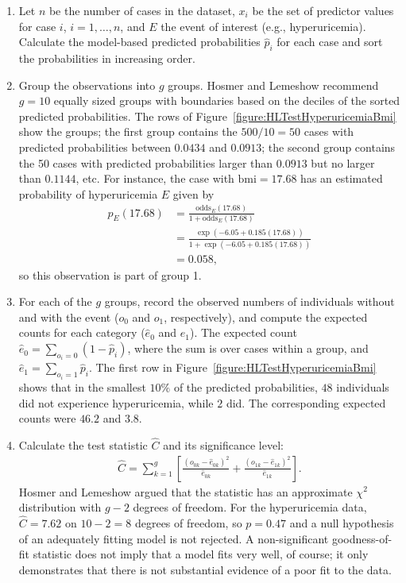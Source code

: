 \begin{enumerate}
  \item Let $n$ be the number of cases in the dataset, $x_i$ be the set of predictor values for case $i$, $i = 1, \ldots, n$, and $E$ the event of interest (e.g., hyperuricemia). Calculate the model-based predicted probabilities $\hat{p}_i$ for each case and sort the probabilities in increasing order.

  \item Group the observations into $g$ groups.   Hosmer and Lemeshow recommend $g = 10$ equally sized groups with boundaries based on the deciles of the sorted predicted probabilities.  The rows of Figure~\ref{figure:HLTestHyperuricemiaBmi} show the groups; the first group contains the $500/10 = 50$ cases with predicted probabilities between $0.0434$ and $0.0913$; the second group contains the 50 cases with predicted probabilities larger than $0.0913$ but no larger than $0.1144$, etc.  For instance, the case with $\textrm{bmi} = 17.68$ has an estimated probability of hyperuricemia $E$ given by
\begin{align*}
  p_{E}(17.68) &= \frac{\textrm{odds}_{E}(17.68)}
    {1 + \textrm{odds}_{E}(17.68)} \\
    &= \frac{\exp(-6.05 + 0.185(17.68))}
    {1 + \exp(-6.05 + 0.185(17.68))} \\
    &= 0.058,
\end{align*}
so this observation is part of group 1.

   \item For each of the $g$ groups, record the observed numbers of individuals without and with the event ($o_0$ and $o_1$, respectively), and compute the expected counts for each category ($\hat{e}_0$ and $\hat{e}_1$).  The expected count $\hat{e}_0 =\sum_{o_i = 0}(1 - \hat{p}_i)$, where the sum is over cases within a group, and $\hat{e}_1 = \sum_{o_i = 1} \hat{p}_i$. The first row in Figure~\ref{figure:HLTestHyperuricemiaBmi} shows that in the smallest $10\%$ of the predicted probabilities, $48$ individuals did not experience hyperuricemia, while $2$ did.  The corresponding expected counts were $46.2$ and $3.8$.

  \item Calculate the test statistic $\hat{C}$ and its significance level:
  \begin{align*}
    \hat{C} = \sum_{k=1}^g \left[\frac{(o_{0k} - \hat{e}_{0k})^2}
            {\hat{e}_{0k}} +
            \frac{(o_{1k} - \hat{e}_{1k})^2}
            {\hat{e}_{1k}} \right].
\end{align*}
 Hosmer and Lemeshow argued that the statistic has an approximate $\chi^2$ distribution with $g - 2$ degrees of freedom.  For the hyperuricemia data, $\hat{C} = 7.62$ on $10 - 2 = 8$ degrees of freedom, so $p = 0.47$ and a null hypothesis of an adequately fitting model is not rejected.  A non-significant goodness-of-fit statistic does not imply that a model fits very well, of course; it only demonstrates that there is not substantial evidence of a poor fit to the data.

\end{enumerate}

